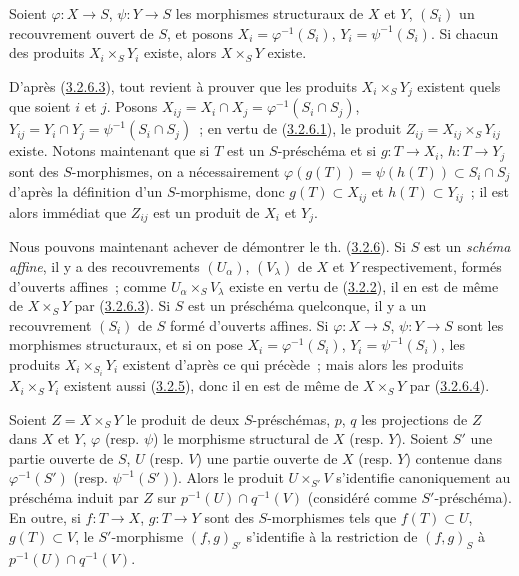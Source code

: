\begin{lemma}[3.2.6.4]
\label{I.3.2.6.4-fr}
Soient $\varphi:X\to S$, $\psi:Y\to S$ les morphismes structuraux de $X$
et $Y$, $(S_i)$ un recouvrement ouvert de $S$, et posons
$X_i=\varphi^{-1}(S_i)$, $Y_i=\psi^{-1}(S_i)$. Si chacun des produits
$X_i\times_S Y_i$ existe, alors $X\times_S Y$ existe.
\end{lemma}

D'après (\hyperref[I.3.2.6.3-fr]{3.2.6.3}), tout revient à prouver que les
produits $X_i\times_S Y_j$ existent quels que soient $i$ et $j$. Posons
$X_{ij}=X_i\cap X_j=\varphi^{-1}(S_i\cap S_j)$,
$Y_{ij}=Y_i\cap Y_j=\psi^{-1}(S_i\cap S_j)$~; en vertu de
(\hyperref[I.3.2.6.1-fr]{3.2.6.1}), le produit
$Z_{ij}=X_{ij}\times_S Y_{ij}$ existe. Notons maintenant que si $T$ est un
$S$-préschéma et si $g:T\to X_i$, $h:T\to Y_j$ sont des $S$-morphismes, on
a nécessairement
$\varphi(g(T))=\psi(h(T))\subset S_i\cap S_j$ d'après la définition d'un
$S$-morphisme, donc $g(T)\subset X_{ij}$ et $h(T)\subset Y_{ij}$~; il est
alors immédiat que $Z_{ij}$ est un produit de $X_i$ et $Y_j$.

\begin{env}[3.2.6.5]
\label{I.3.2.6.5-fr}
Nous pouvons maintenant achever de démontrer le th.
(\hyperref[I.3.2.6-fr]{3.2.6}). Si $S$ est un \emph{schéma affine}, il y a
des recouvrements $(U_\alpha)$, $(V_\lambda)$ de $X$ et $Y$ respectivement,
formés d'ouverts affines~; comme $U_\alpha\times_S V_\lambda$ existe en
vertu de (\hyperref[I.3.2.2-fr]{3.2.2}), il en est de même de
$X\times_S Y$ par (\hyperref[I.3.2.6.3-fr]{3.2.6.3}). Si $S$ est un
préschéma quelconque, il y a un recouvrement $(S_i)$ de $S$ formé d'ouverts
affines. Si $\varphi:X\to S$, $\psi:Y\to S$ sont les morphismes
structuraux, et si on pose $X_i=\varphi^{-1}(S_i)$,
$Y_i=\psi^{-1}(S_i)$, les produits $X_i\times_{S_i}Y_i$ existent d'après ce
qui
précède~; mais alors les produits $X_i\times_S Y_i$ existent aussi
(\hyperref[I.3.2.5-fr]{3.2.5}), donc il en est de même de $X\times_S Y$ par
(\hyperref[I.3.2.6.4-fr]{3.2.6.4}).
\end{env}

\begin{corollary}[3.2.7]
\label{I.3.2.7-fr}
Soient $Z=X\times_S Y$ le produit de deux $S$-préschémas, $p$, $q$ les
projections de $Z$ dans $X$ et $Y$, $\varphi$ \textup{(resp. $\psi$)} le morphisme
structural de $X$ \textup{(resp. $Y$)}. Soient $S'$ une partie ouverte de $S$, $U$
\textup{(resp. $V$)} une partie ouverte de $X$ \textup{(resp. $Y$)} contenue dans
$\varphi^{-1}(S')$ \textup{(resp. $\psi^{-1}(S')$)}. Alors le produit
$U\times_{S'}V$ s'identifie canoniquement au préschéma induit par $Z$ sur
$p^{-1}(U)\cap q^{-1}(V)$ (considéré comme $S'$-préschéma). En outre, si
$f:T\to X$, $g:T\to Y$ sont des $S$-morphismes tels que $f(T)\subset U$,
$g(T)\subset V$, le $S'$-morphisme $(f,g)_{S'}$ s'identifie à la restriction
de $(f,g)_S$ à $p^{-1}(U)\cap q^{-1}(V)$.
\end{corollary}

